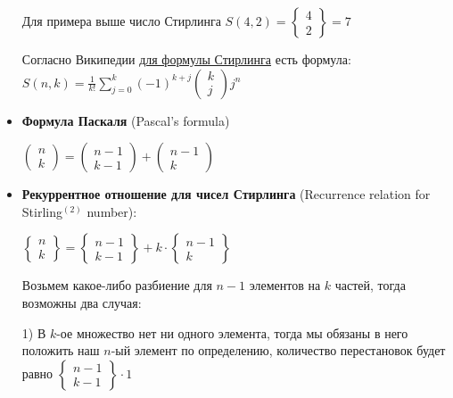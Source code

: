 \documentclass[12pt]{article}
\begin{document}
\begin{itemize}
        Для примера выше число Стирлинга $S(4, 2) = \begin{Bmatrix} 4 \\ 2 \end{Bmatrix} = 7$

        Согласно Википедии \href{https://ru.wikipedia.org/wiki/%D0%A7%D0%B8%D1%81%D0%BB%D0%B0_%D0%A1%D1%82%D0%B8%D1%80%D0%BB%D0%B8%D0%BD%D0%B3%D0%B0_%D0%B2%D1%82%D0%BE%D1%80%D0%BE%D0%B3%D0%BE_%D1%80%D0%BE%D0%B4%D0%B0}{для формулы Стирлинга}
        есть формула: $\displaystyle S(n, k) = \frac{1}{k!} \sum_{j=0}^k (-1)^{k+j} \begin{pmatrix}k \\ j\end{pmatrix}j^n$

        \item \textbf{Формула Паскаля} (Pascal's formula)

        $\begin{pmatrix}
             n \\ k
        \end{pmatrix} = \begin{pmatrix}
                            n - 1 \\ k - 1
        \end{pmatrix} + \begin{pmatrix}
                            n - 1 \\ k
        \end{pmatrix}$

        \item \textbf{Рекуррентное отношение для чисел Стирлинга} (Recurrence relation for Stirling$\displaystyle ^{(2)}$ number):

        $\begin{Bmatrix}
             n \\ k
        \end{Bmatrix} = \begin{Bmatrix}
                            n - 1 \\ k - 1
        \end{Bmatrix} + k \cdot \begin{Bmatrix}
                              n - 1 \\ k
        \end{Bmatrix}$

        Возьмем какое-либо разбиение для $n - 1$ элементов на $k$ частей, тогда возможны два случая:

        1) В $k$-ое множество нет ни одного элемента, тогда мы обязаны в него положить наш $n$-ый элемент по определению,
        количество перестановок будет равно $\begin{Bmatrix}n - 1 \\ k - 1\end{Bmatrix} \cdot 1$


\end{itemize}
\end{document}
